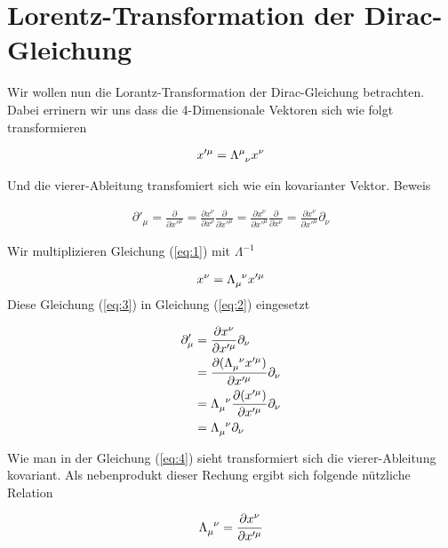 
\usepackage{amsmath} 





\section*{Lorentz-Transformation der Dirac-Gleichung}

Wir wollen nun die Lorantz-Transformation der Dirac-Gleichung betrachten. Dabei errinern wir uns dass die 4-Dimensionale Vektoren sich wie folgt transformieren


\begin{align}
  \label{eq:1}
  x'^{\mu} = \Lambda^{\mu}_{\hphantom\mu \nu}x^{\nu}
\end{align}

Und die vierer-Ableitung transfomiert sich wie ein kovarianter Vektor. Beweis

\begin{align}
  \label{eq:2}
 \partial'_\mu =  \frac{\partial}{\partial x'^\mu} = \frac{\partial x^\nu}{\partial x^\nu } \frac{\partial}{\partial x'^\mu} = \frac{\partial x^\nu}{\partial x'^\mu } \frac{\partial}{\partial x^\nu} = \frac{\partial x^\nu}{\partial x'^\mu }\partial_\nu
\end{align}

Wir multiplizieren Gleichung (\ref{eq:1}) mit \(\Lambda^{-1}\)

\begin{align}
  \label{eq:3}
  x^{\nu} = \Lambda_{\mu}^{\hphantom\mu \nu}x'^\mu
\end{align}
Diese Gleichung (\ref{eq:3}) in Gleichung (\ref{eq:2}) eingesetzt

\begin{align}
  \label{eq:4}
   \partial'_\mu &= \frac{\partial x^\nu}{\partial x'^\mu } \partial_\nu \notag \\
&= \frac{\partial (\Lambda_{\mu}^{\hphantom\mu \nu}x'^\mu) }{\partial x'^\mu } \partial_\nu \notag \\
&= \Lambda_{\mu}^{\hphantom\mu \nu}\frac{\partial (x'^\mu) }{\partial x'^\mu } \partial_\nu  \notag\\
&= \Lambda_{\mu}^{\hphantom\mu \nu}\partial_\nu
\end{align}

Wie man in der Gleichung (\ref{eq:4}) sieht transformiert sich die vierer-Ableitung kovariant. Als nebenprodukt dieser Rechung ergibt sich folgende nützliche Relation

\begin{align}
  \label{eq:5}
  \Lambda_{\mu}^{\hphantom\mu \nu} = \frac{\partial x^\nu}{\partial x'^\mu }
\end{align}


